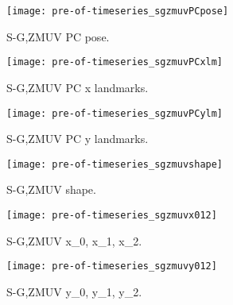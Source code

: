 \documentclass[a4paper,12pt]{article}
\begin{document}
\begin{figure}
\centering
\texttt{[image: pre-of-timeseries\_sgzmuvPCpose]}
\caption{S-G,ZMUV PC pose.}
\end{figure}



\begin{figure}
\centering
\texttt{[image: pre-of-timeseries\_sgzmuvPCxlm]}
\caption{S-G,ZMUV PC x landmarks.}
\end{figure}


\begin{figure}
\centering
\texttt{[image: pre-of-timeseries\_sgzmuvPCylm]}
\caption{S-G,ZMUV PC y landmarks.}
\end{figure}




\begin{figure}
\centering
\texttt{[image: pre-of-timeseries\_sgzmuvshape]}
\caption{S-G,ZMUV shape.}
\end{figure}


\begin{figure}
\centering
\texttt{[image: pre-of-timeseries\_sgzmuvx012]}
\caption{S-G,ZMUV x\_0, x\_1, x\_2.}
\end{figure}



\begin{figure}
\centering
\texttt{[image: pre-of-timeseries\_sgzmuvy012]}
\caption{S-G,ZMUV y\_0, y\_1, y\_2.}
\end{figure}
\end{document}
